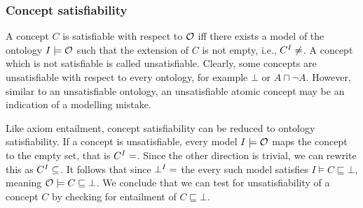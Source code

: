 \subsubsection{Concept satisfiability} \label{concept-satisfiability}

A concept $C$ is satisfiable with respect to $\mathcal{O}$ iff there exists a model of the ontology $I \models \mathcal{O}$ such that the extension of $C$ is not empty, i.e., $C^I \not= \empty$. A concept which is not satisfiable is called unsatisfiable. Clearly, some concepts are unsatisfiable with respect to every ontology, for example $\bot$ or $A \sqcap \lnot A$. However, similar to an unsatisfiable ontology, an unsatisfiable atomic concept may be an indication of a modelling mistake.

Like axiom entailment, concept satisfiability can be reduced to ontology satisfiability. If a concept is unsatisfiable, every model $I \models \mathcal{O}$ maps the concept to the empty set, that is $C^I = \empty$. Since the other direction is trivial, we can rewrite this as $C^I \subseteq \empty$. It follows that since $\bot^I = \empty$ the every such model satisfies $I \models C \sqsubseteq \bot$, meaning $\mathcal{O} \models C \sqsubseteq \bot$. We conclude that we can test for unsatisfiability of a concept $C$ by checking for entailment of $C \sqsubseteq \bot$.
